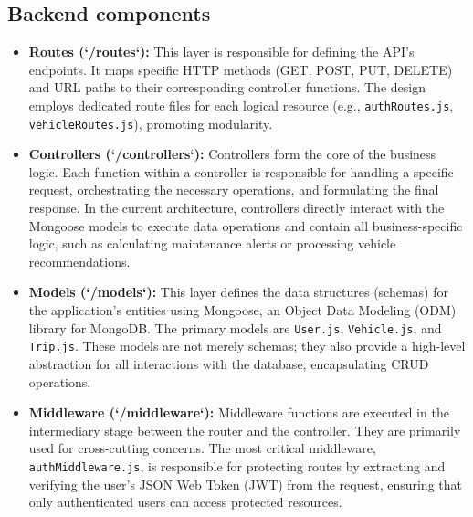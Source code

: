 \subsection{Backend components}
\begin{itemize}
    \item \textbf{Routes (`/routes`):} This layer is responsible for defining the API's endpoints. It maps specific HTTP methods (GET, POST, PUT, DELETE) and URL paths to their corresponding controller functions. The design employs dedicated route files for each logical resource (e.g., \texttt{authRoutes.js}, \texttt{vehicleRoutes.js}), promoting modularity.

    \textgap
    
    \item \textbf{Controllers (`/controllers`):} Controllers form the core of the business logic. Each function within a controller is responsible for handling a specific request, orchestrating the necessary operations, and formulating the final response. In the current architecture, controllers directly interact with the Mongoose models to execute data operations and contain all business-specific logic, such as calculating maintenance alerts or processing vehicle recommendations.
    
    \textgap
    
    \item \textbf{Models (`/models`):} This layer defines the data structures (schemas) for the application's entities using Mongoose, an Object Data Modeling (ODM) library for MongoDB. The primary models are \texttt{User.js}, \texttt{Vehicle.js}, and \texttt{Trip.js}. These models are not merely schemas; they also provide a high-level abstraction for all interactions with the database, encapsulating CRUD operations.
    
    \textgap
    
    \item \textbf{Middleware (`/middleware`):} Middleware functions are executed in the intermediary stage between the router and the controller. They are primarily used for cross-cutting concerns. The most critical middleware, \texttt{authMiddleware.js}, is responsible for protecting routes by extracting and verifying the user's JSON Web Token (JWT) from the request, ensuring that only authenticated users can access protected resources.
\end{itemize}

